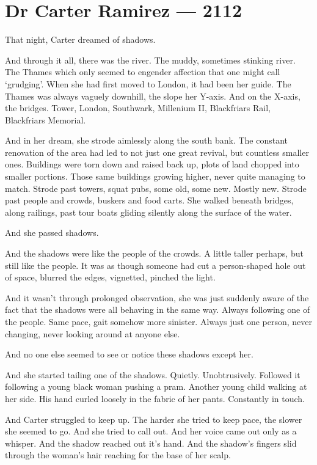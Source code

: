 \hypertarget{dr-carter-ramirez-2112}{%
\chapter*{Dr Carter Ramirez — 2112}\label{dr-carter-ramirez-2112}}

That night, Carter dreamed of shadows.

And through it all, there was the river. The muddy, sometimes stinking river. The Thames which only seemed to engender affection that one might call `grudging'. When she had first moved to London, it had been her guide. The Thames was always vaguely downhill, the slope her Y-axis. And on the X-axis, the bridges. Tower, London, Southwark, Millenium II, Blackfriars Rail, Blackfriars Memorial.

And in her dream, she strode aimlessly along the south bank. The constant renovation of the area had led to not just one great revival, but countless smaller ones. Buildings were torn down and raised back up, plots of land chopped into smaller portions. Those same buildings growing higher, never quite managing to match. Strode past towers, squat pubs, some old, some new. Mostly new. Strode past people and crowds, buskers and food carts. She walked beneath bridges, along railings, past tour boats gliding silently along the surface of the water.

And she passed shadows.

And the shadows were like the people of the crowds. A little taller perhaps, but still like the people. It was as though someone had cut a person-shaped hole out of space, blurred the edges, vignetted, pinched the light.

And it wasn't through prolonged observation, she was just suddenly aware of the fact that the shadows were all behaving in the same way. Always following one of the people. Same pace, gait somehow more sinister. Always just one person, never changing, never looking around at anyone else.

And no one else seemed to see or notice these shadows except her.

And she started tailing one of the shadows. Quietly. Unobtrusively. Followed it following a young black woman pushing a pram. Another young child walking at her side. His hand curled loosely in the fabric of her pants. Constantly in touch.

And Carter struggled to keep up. The harder she tried to keep pace, the slower she seemed to go. And she tried to call out. And her voice came out only as a whisper. And the shadow reached out it's hand. And the shadow's fingers slid through the woman's hair reaching for the base of her scalp.

